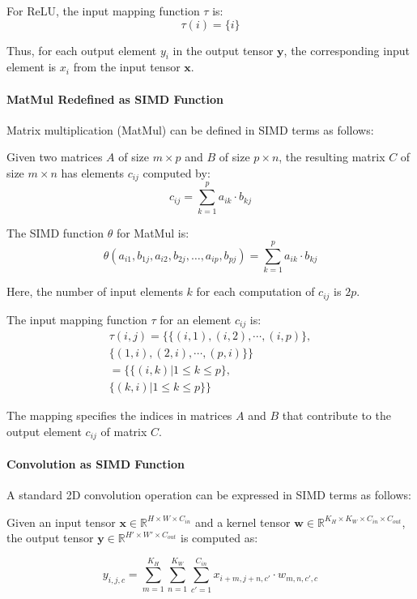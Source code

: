 For ReLU, the input mapping function $\tau$ is:
\[
\tau(i) = \{i\}
\]

Thus, for each output element $y_i$ in the output tensor $\mathbf{y}$, the corresponding input element is $x_i$ from the input tensor $\mathbf{x}$.

\paragraph{MatMul Redefined as SIMD Function}

Matrix multiplication (MatMul) can be defined in SIMD terms as follows:

Given two matrices $A$ of size $m \times p$ and $B$ of size $p \times n$, the resulting matrix $C$ of size $m \times n$ has elements $c_{ij}$ computed by:
\[
c_{ij} = \sum_{k=1}^{p} a_{ik} \cdot b_{kj}
\]

The SIMD function $\theta$ for MatMul is:
\[
\theta(a_{i1}, b_{1j}, a_{i2}, b_{2j}, \dots, a_{ip}, b_{pj}) = \sum_{k=1}^{p} a_{ik} \cdot b_{kj}
\]

Here, the number of input elements $k$ for each computation of $c_{ij}$ is $2p$.

The input mapping function $\tau$ for an element $c_{ij}$ is:
\[
\begin{split}
\tau(i, j) = \{ \{(i, 1), (i, 2), \cdots, (i, p)\}, \\
                \{(1, i), (2, i), \cdots, (p, i)\} \} \\
           = \{ \{(i, k) | 1 \leq k \leq p \}, \\
                \{(k, i) | 1 \leq k \leq p \} \}
\end{split}
\]

The mapping specifies the indices in matrices $A$ and $B$ that contribute to the output element $c_{ij}$ of matrix $C$.

\paragraph{Convolution as SIMD Function}

A standard 2D convolution operation can be expressed in SIMD terms as follows:

Given an input tensor $\mathbf{x} \in \mathbb{R}^{H \times W \times C_{in}}$ and a kernel tensor $\mathbf{w} \in \mathbb{R}^{K_H \times K_W \times C_{in} \times C_{out}}$, the output tensor $\mathbf{y} \in \mathbb{R}^{H' \times W' \times C_{out}}$ is computed as:

\[
y_{i,j,c} = \sum_{m=1}^{K_H} \sum_{n=1}^{K_W} \sum_{c'=1}^{C_{in}} x_{i+m, j+n, c'} \cdot w_{m, n, c', c}
\]

